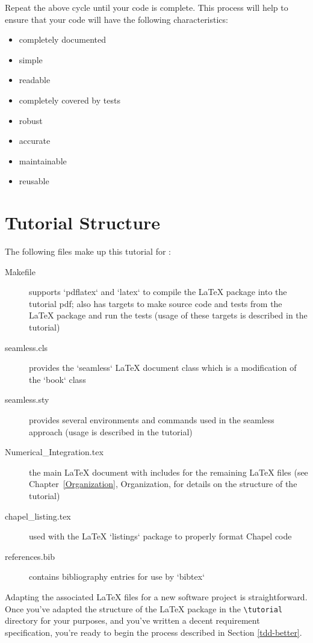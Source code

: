 Repeat the above cycle until your code is complete. This process will help to ensure that your code will 
have the following characteristics:
\begin{itemize}
  \item completely documented
  \item simple
  \item readable
  \item completely covered by tests
  \item robust
  \item accurate
  \item maintainable
  \item reusable
\end{itemize}

\section{Tutorial Structure}

The following files make up this tutorial for \seamless:
\begin{description}
  \item[Makefile] supports `pdflatex` and `latex` to compile the LaTeX package into the tutorial
    pdf; also has targets to make source code and tests from the LaTeX package and run the tests (usage of these
    targets is described in the tutorial)
  \item[seamless.cls] provides the `seamless` LaTeX document class which is a modification of the `book` class
  \item[seamless.sty] provides several environments and commands used in the seamless approach (usage is described
    in the tutorial)
  \item[Numerical\_Integration.tex] the main LaTeX document with includes for the remaining LaTeX files 
    (see Chapter~\ref{Organization}, Organization, for details on the structure of the tutorial)
  \item[chapel\_listing.tex] used with the LaTeX `listings` package to properly format Chapel code
  \item[references.bib] contains bibliography entries for use by `bibtex`
\end{description}

Adapting the associated \LaTeX\xspace files for a new software project is straightforward. 
Once you've adapted the structure of the \LaTeX\xspace package in the \lstinline{\tutorial} directory for your
purposes, and you've written a decent requirement specification, you're ready to begin the process described in
Section \ref{tdd-better}. 

